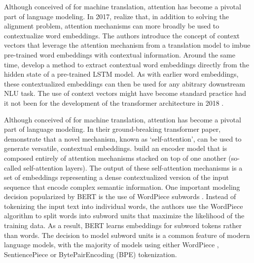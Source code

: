 Although conceived of for machine translation, attention has become a pivotal part of language modeling. In 2017, \cite{mccann2017learned} realize that, in addition to solving the alignment problem, attention mechanisms can more broadly be used to contextualize word embeddings. The authors introduce the concept of context vectors that leverage the attention mechanism from a translation model to imbue pre-trained word embeddings with contextual information. Around the same time, \cite{peters2018deep} develop a method to extract contextual word embeddings directly from the hidden state of a pre-trained LSTM model. As with earlier word embeddings, these contextualized embeddings can then be used for any abitrary downstream NLU task. The use of context vectors might have become standard practice had it not been for the development of the transformer architecture in 2018 \citep{vaswani2017attention}.

Although conceived of for machine translation, attention has become a pivotal part of language modeling. In their ground-breaking transformer paper, \cite{vaswani2017attention} demonstrate that a novel mechanism, known as `self-attention', can be used to generate versatile, contextual embeddings. \cite{vaswani2017attention} build an encoder model that is composed entirely of attention mechanisms stacked on top of one another (so-called self-attention layers).
The output of these self-attention mechanisms is a set of embeddings representing a dense contextualized version of the input sequence that encode complex semantic information. One important modeling decision popularized by BERT is the use of WordPiece subwords \citep{wu2016google}. Instead of tokenizing the input text into individual words, the authors use the WordPiece algorithm to split words into subword units that maximize the likelihood of the training data. As a result, BERT learns embeddings for subword tokens rather than words. The decision to model subword units is a common feature of modern language models, with the majority of models using either WordPiece \citep{wu2016google}, SentiencePiece \citep{kudo-2018-subword} or BytePairEncoding (BPE) \citep{sennrich2015neural} tokenization. %


